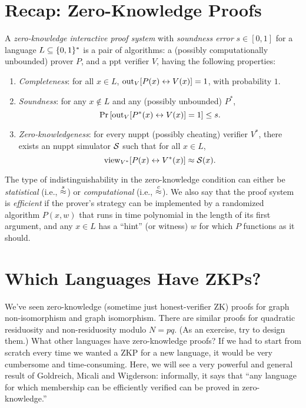 \documentclass[11pt]{article}
\begin{document}
\thispagestyle{fancy}           %


\section{Recap: Zero-Knowledge Proofs}
\label{sec:recap:zkp}

\begin{definition}
  \label{def:ips}
  A \emph{zero-knowledge interactive proof system} with
  \emph{soundness error} $s \in [0,1]$ for a language $L \subseteq
  \{0,1\}^{*}$ is a pair of algorithms: a (possibly computationally
  unbounded) prover $P$, and a ppt verifier $V$, having the following
  properties:
  \begin{enumerate}
  \item \emph{Completeness}: for all $x \in L$, $\text{out}_{V}[ P(x)
    \leftrightarrow V(x) ] = 1$, with probability $1$.
  \item \emph{Soundness}: for any $x \not\in L$ and any (possibly
    unbounded) $P^{*}$,
    \[ \Pr\left[ \text{out}_{V}[ P^{*}(x) \leftrightarrow V(x) ] = 1 \right]
    \leq s. \]
  \item \emph{Zero-knowledgeness}: for every nuppt (possibly cheating)
    verifier $V^{*}$, there exists an nuppt simulator $\mathcal{S}$ such that
    for all $x \in L$, \[ \text{view}_{V^{*}}[P(x) \leftrightarrow V^{*}(x)]
    \approx \mathcal{S}(x). \]
  \end{enumerate}

  The type of indistinguishability in the zero-knowledge condition can
  either be \emph{statistical} (i.e., $\stackrel{s}{\approx}$) or
  \emph{computational} (i.e., $\stackrel{c}{\approx}$).  We also say that the proof
  system is \emph{efficient} if the prover's strategy can be
  implemented by a randomized algorithm $P(x,w)$ that runs in time
  polynomial in the length of its first argument, and any $x \in L$
  has a ``hint'' (or witness) $w$ for which $P$ functions as it
  should.
\end{definition}

\section{Which Languages Have ZKPs?}
\label{sec:which-languages-zkp}

We've seen zero-knowledge (sometime just honest-verifier ZK) proofs
for graph non-isomorphism and graph isomorphism.  There are similar
proofs for quadratic residuosity and non-residuosity modulo $N=pq$.
(As an exercise, try to design them.)  What other languages have
zero-knowledge proofs?  If we had to start from scratch every time we
wanted a ZKP for a new language, it would be very cumbersome and
time-consuming.  Here, we will see a very powerful and general result
of Goldreich, Micali and Wigderson: informally, it says that ``any
language for which membership can be efficiently verified can be
proved in zero-knowledge.''
\end{document}
